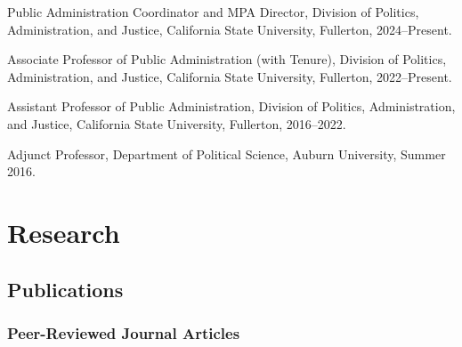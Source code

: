 \documentclass[12pt,letterpaper]{article}
\renewenvironment{itemize}{
  \begin{list}{}{
    \setlength{\leftmargin}{1.5em}
    \setlength{\itemsep}{0.25em}
    \setlength{\parskip}{0pt}
    \setlength{\parsep}{0.25em}
  }
}{
  \end{list}
}
\begin{document}
  \begin{itemize}\leftmargin=2pt\itemindent=-15pt\leftmargin=2pt\itemindent=-15pt
      \item Public Administration Coordinator and MPA Director, Division of Politics, Administration, and Justice, California State University, Fullerton, 2024--Present. \vspace{0.2cm}
      \item Associate Professor of Public Administration (with Tenure), Division of Politics, Administration, and Justice, California State University, Fullerton, 2022--Present. \vspace{0.2cm}
      \item Assistant Professor of Public Administration, Division of Politics, Administration, and Justice, California State University, Fullerton,  2016--2022.\vspace{0.2cm}
      \item Adjunct Professor, Department of Political Science, Auburn University, Summer 2016.
  \end{itemize}

\section*{Research}

\subsection*{Publications}

\subsubsection*{Peer-Reviewed Journal Articles}
\end{document}
